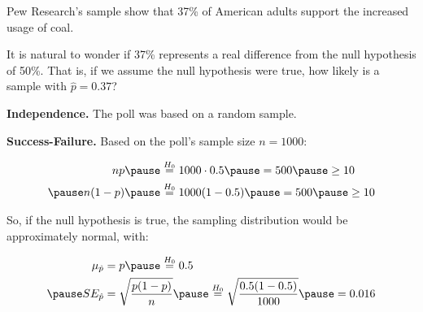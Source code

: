 \documentclass{beamer}
\begin{document}
\begin{frame}
  \begin{example}
    Pew Research's sample show that 37\% of American adults support the increased usage of coal.\pause

    \vspace{1mm}
    It is natural to wonder if 37\% represents a real difference from the null hypothesis of 50\%. That is, if we assume the null hypothesis were true, how likely is a sample with $\hat{p}=0.37$?\pause

    \vspace{1mm}
    \textbf{Independence.} The poll was based on a random sample.\pause

    \vspace{1mm}
    \textbf{Success-Failure.} Based on the poll's sample size $n=1000$:

    \vspace{-3mm}
    \begin{equation*}
      \begin{aligned}
        np\pause &\overset{H_0}{=} 1000\cdot 0.5\pause = 500\pause \geq 10\\\pause
        n(1-p)\pause &\overset{H_0}{=} 1000(1-0.5)\pause = 500\pause \geq 10
      \end{aligned}
    \end{equation*}

    \vspace{-1mm}
    So, if the null hypothesis is true, the sampling distribution would be approximately normal, with:

    \vspace{-3mm}
    \begin{equation*}
      \begin{aligned}
        \mu_{\hat{p}} &= p\pause \overset{H_0}{=} 0.5 \\\pause
        SE_{\hat{p}} &= \sqrt{\dfrac{p(1-p)}{n}}\pause \overset{H_0}{=} \sqrt{\dfrac{0.5(1-0.5)}{1000}}\pause = 0.016
      \end{aligned}
    \end{equation*}
  \end{example}
\end{frame}
\end{document}
